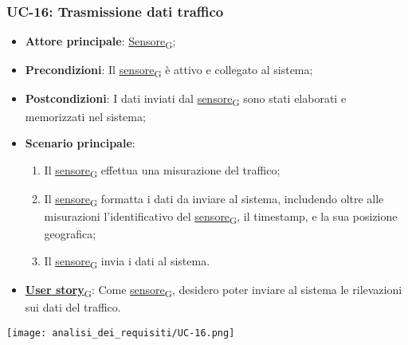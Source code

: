 \subsubsection{UC-16: Trasmissione dati traffico}
\begin{itemize}
	\item \textbf{Attore principale}: \href{https://7last.github.io/docs/rtb/documentazione-interna/glossario\#sensore}{Sensore\textsubscript{G}};
	\item \textbf{Precondizioni}: Il \href{https://7last.github.io/docs/rtb/documentazione-interna/glossario\#sensore}{sensore\textsubscript{G}} è attivo e collegato al sistema;
	\item \textbf{Postcondizioni}: I dati inviati dal \href{https://7last.github.io/docs/rtb/documentazione-interna/glossario\#sensore}{sensore\textsubscript{G}} sono stati elaborati e memorizzati nel sistema;
	\item \textbf{Scenario principale}:
	      \begin{enumerate}
		      \item Il \href{https://7last.github.io/docs/rtb/documentazione-interna/glossario\#sensore}{sensore\textsubscript{G}} effettua una misurazione del traffico;
		      \item Il \href{https://7last.github.io/docs/rtb/documentazione-interna/glossario\#sensore}{sensore\textsubscript{G}} formatta i dati da inviare al sistema, includendo oltre alle misurazioni l'identificativo del \href{https://7last.github.io/docs/rtb/documentazione-interna/glossario\#sensore}{sensore\textsubscript{G}},
		            il timestamp, e la sua posizione geografica;
		      \item Il \href{https://7last.github.io/docs/rtb/documentazione-interna/glossario\#sensore}{sensore\textsubscript{G}} invia i dati al sistema.
	      \end{enumerate}
	\item \href{https://7last.github.io/docs/rtb/documentazione-interna/glossario\#user-story}{\textbf{User story}\textsubscript{G}}: Come \href{https://7last.github.io/docs/rtb/documentazione-interna/glossario\#sensore}{sensore\textsubscript{G}}, desidero poter inviare al sistema le rilevazioni sui dati del traffico.
\end{itemize}

\begin{center}
	\texttt{[image: analisi\_dei\_requisiti/UC-16.png]}
\end{center}



